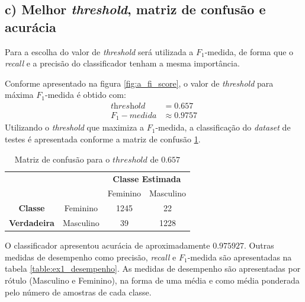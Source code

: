 \documentclass{article}
\begin{document}
    \subsection[]{c) Melhor \textit{threshold}, matriz de confusão e acurácia}
    Para a escolha do valor de \textit{threshold} será utilizada a $F_1$-medida, de forma que
    o \textit{recall} e a precisão do classificador tenham a mesma importância.

    Conforme apresentado na figura \ref{fig:a_fi_score}, o valor de \textit{threshold} para máxima $F_1$-medida é
    obtido com:
    \begin{align}
        \textit{threshold}&=0.657 \\
        F_1-medida&\approx0.9757
    \end{align}
    Utilizando o \textit{threshold} que maximiza a $F_1$-medida, a classificação do \textit{dataset} de testes é 
    apresentada conforme a matriz de confusão \ref{ex1_cm}.
    \begin{table}[]
        \begin{tabular}{cccc}
            &  & \multicolumn{2}{c}{\textbf{Classe Estimada}} \\
            &  & Feminino & Masculino \\ \cline{3-4} 
            \textbf{Classe} & \multicolumn{1}{c|}{Feminino} & \multicolumn{1}{c|}{1245} & \multicolumn{1}{c|}{22} \\ \cline{3-4} 
            \textbf{Verdadeira} & \multicolumn{1}{c|}{Masculino} & \multicolumn{1}{c|}{39} & \multicolumn{1}{c|}{1228} \\ \cline{3-4} 
        \end{tabular}
        \caption{Matriz de confusão para o $threshold$ de $0.657$}
        \label{ex1_cm}
    \end{table}
    O classificador apresentou acurácia de aproximadamente $0.975927$. Outras medidas de desempenho como precisão, \textit{recall} e
    $F_1$-medida são apresentadas na tabela \ref{table:ex1_desempenho}. As medidas de desempenho são apresentadas por rótulo (Masculino e Feminino),
    na forma de uma média e como média ponderada pelo número de amostras de cada classe.
\end{document}
